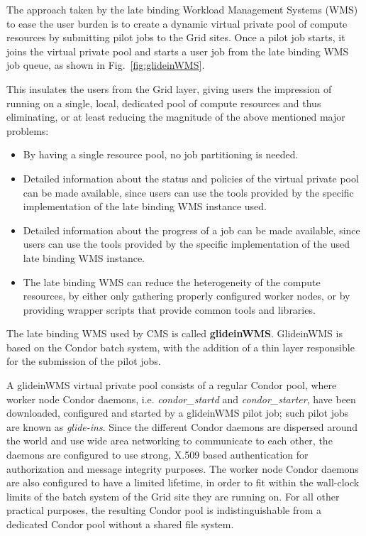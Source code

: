 \documentclass[a4paper]{jpconf}
\begin{document}
The approach taken by the late binding Workload Management Systems (WMS) to ease the user burden is 
to create a dynamic virtual private pool of compute resources by submitting pilot jobs to the Grid sites.
Once a pilot job starts, it joins the virtual private pool and starts a user job from the late binding WMS job queue, 
as shown in Fig.~\ref{fig:glideinWMS}.

This insulates the users from the Grid layer, giving users
the impression of running on a single, local, dedicated pool of compute resources
and thus eliminating, or at least reducing the magnitude of the above mentioned major problems:
\begin {itemize}
\item 
By having a single resource pool, no job partitioning is needed.
\item
Detailed information about the status and policies of the virtual private pool can be made available, 
since users can use the tools provided by the specific implementation of the late binding WMS instance used.
\item 
Detailed information about the progress of a job can be made available,
since users can use the tools provided by the specific implementation of the used late binding WMS instance.
\item
The late binding WMS can reduce the heterogeneity of the compute resources, 
by either only gathering properly configured worker nodes,
or by providing wrapper scripts that provide common tools and libraries.
\end{itemize}

The late binding WMS used by CMS is called \textbf{glideinWMS}. GlideinWMS is based on the Condor batch system, 
with the addition of a thin layer responsible for the submission of the pilot jobs.

A glideinWMS virtual private pool consists of a regular Condor pool, 
where worker node Condor daemons, i.e. \emph{condor\_startd} and \emph{condor\_starter}, 
have been downloaded, configured and started by a glideinWMS pilot job; such pilot jobs are known as \emph{glide-ins}. 
Since the different Condor daemons are dispersed around the world and use wide area networking to communicate to each other,
the daemons are configured to use strong, X.509 based authentication for authorization and message integrity purposes.
The worker node Condor daemons are also configured to have a limited lifetime, in order to fit within the wall-clock limits 
of the batch system of the Grid site they are running on.
For all other practical purposes, the resulting Condor pool is indistinguishable from a dedicated Condor pool without a shared file system.
\end{document}
